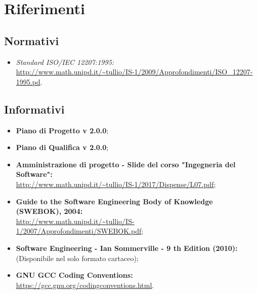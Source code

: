 \documentclass[./NormediProgetto.tex]{subfiles}
\begin{document}
\section{Riferimenti}

\subsection*{Normativi}

\begin{itemize}
	\item \textit{Standard ISO/IEC 12207:1995:}\\
	 \url{http://www.math.unipd.it/~tullio/IS-1/2009/Approfondimenti/ISO_12207-1995.pd}.
\end{itemize}

\subsection*{Informativi}

\begin{itemize}
	\item \textbf{Piano di Progetto v 2.0.0};
	\item \textbf{Piano di Qualifica v 2.0.0};
	\item \textbf{Amministrazione di progetto - Slide del corso "Ingegneria del
	Software":}\\	\url{http://www.math.unipd.it/~tullio/IS-1/2017/Dispense/L07.pdf};
	\item \textbf{Guide to the Software Engineering Body of Knowledge (SWEBOK), 2004:}\\
	\url{http://www.math.unipd.it/~tullio/IS-1/2007/Approfondimenti/SWEBOK.pdf};
	\item \textbf{Software Engineering - Ian Sommerville - 9 th Edition (2010):}\\
	(Disponibile nel solo formato cartaceo);
	\item \textbf{GNU GCC Coding Conventions:}\\ \url{https://gcc.gnu.org/codingconventions.html}.
\end{itemize}
\end{document}
